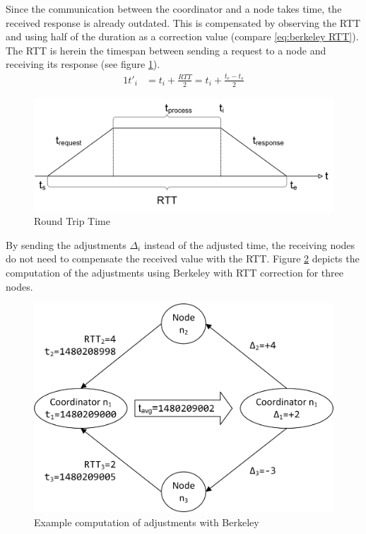 		Since the communication between the coordinator and a node takes time, the received response is already outdated. This is compensated by observing the \gls{RTT} and using half of the duration as a correction value (compare \ref{eq:berkeley RTT}). The \gls{RTT} is herein the timespan between sending a request to a node and receiving its response (see figure \ref{figure:berkeley RTT}).
		\begin{alignat}{1}
		t'_i &=t_i+\frac{RTT}{2}=t_i+\frac{t_e-t_s}{2} \label{eq:berkeley RTT}
		\end{alignat}
		
		\begin{figure}[!htbp] %
			\caption{Round Trip Time} \label{figure:berkeley RTT}
			\includegraphics[scale=1.0]{figures/berkeley.png}
		\end{figure}
		
		 By sending the adjustments $\Delta_i$ instead of the adjusted time, the receiving nodes do not need to compensate the received value with the \gls{RTT}. Figure \ref{figure:berkeley example} depicts the computation of the adjustments using Berkeley with \gls{RTT} correction for three nodes. 
		
		\begin{figure}[!htbp] %
			\caption{Example computation of adjustments with Berkeley} \label{figure:berkeley example}
			\includegraphics[scale=1.0]{figures/berkeley-example.png}
		\end{figure}
	
